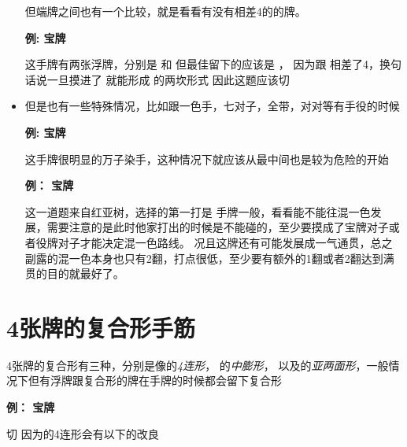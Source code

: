 \documentclass[小V的日麻笔记.tex]{subfiles}
\begin{document}
\begin{itemize}
但端牌之间也有一个比较，就是看看有没有相差4的的牌。

\textbf{例: 宝牌 }


\begin{itemize}
\arrowitem 这手牌有两张浮牌，分别是  和 
\arrowitem 但最佳留下的应该是 ， 因为跟  相差了4，换句话说一旦摸进了  就能形成  的两坎形式
\arrowitem 因此这题应该切 
\end{itemize}

\item 但是也有一些特殊情况，比如跟一色手，七对子，全带，对对等有手役的时候

\textbf{例: 宝牌 }


\begin{itemize}
\arrowitem 这手牌很明显的万子染手，这种情况下就应该从最中间也是较为危险的开始
\end{itemize}

\textbf{例： 宝牌 } 


\begin{itemize}
\arrowitem 这一道题来自红亚树，选择的第一打是 
\arrowitem 手牌一般，看看能不能往混一色发展，需要注意的是此时他家打出的时候是不能碰的，至少要摸成了宝牌对子或者役牌对子才能决定混一色路线。
\arrowitem 况且这牌还有可能发展成一气通贯，总之副露的混一色本身也只有2翻，打点很低，至少要有额外的1翻或者2翻达到满贯的目的就最好了。
\end{itemize}

\end{itemize}

\section{4张牌的复合形手筋}
4张牌的复合形有三种，分别是像的\emph{4连形}， 的\emph{中膨形}， 以及的\emph{亚两面形}，一般情况下但有浮牌跟复合形的牌在手牌的时候都会留下复合形


\textbf{例： 宝牌 } 


\begin{itemize}
\arrowitem 切 
\arrowitem 因为的4连形会有以下的改良 \newline
{} \newline
{} \newline
{} \newline
{}
\end{itemize}
\end{document}
